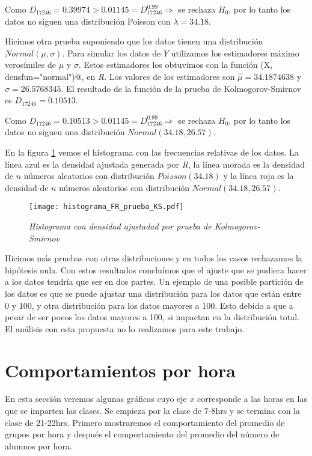 Como $D_{17246} = 0.39974 > 0.01145 = D_{17246}^{0.99} \Rightarrow $ se rechaza $H_{0}$, por lo tanto los datos no siguen una distribución Poisson con $\lambda = 34.18$.


Hicimos otra prueba suponiendo que los datos tienen una distribución $Normal(\mu,\sigma)$. Para simular los datos de $Y$ utilizamos los estimadores máximo verosímiles de $\mu$ y $\sigma$. Estos estimadores los obtuvimos con la función \verb@fitdistr(X, densfun="normal")@, en \textit{R}. Los valores de los estimadores son $\hat{\mu} = 34.1874638$ y $\hat{\sigma} = 26.5768345$. El resultado de la función de la prueba de Kolmogorov-Smirnov es $D_{17246} = 0.10513$.

Como $D_{17246} = 0.10513 > 0.01145 = D_{17246}^{0.99} \Rightarrow $ se rechaza $H_{0}$, por lo tanto los datos no siguen una distribución $Normal(34.18,26.57)$.

En la figura \ref{histFR_pruebaKS} vemos el histograma con las frecuencias relativas de los datos. La línea azul es la densidad ajustada generada por \textit{R}, la línea morada es la densidad de $n$ números aleatorios con distribución  $Poisson(34.18)$ y la línea roja es la densidad de $n$ números aleatorios con distribución  $Normal(34.18,26.57)$.

\begin{figure}[H]
\centering
\texttt{[image: histograma\_FR\_prueba\_KS.pdf]} %
\caption{\textit{Histograma con densidad ajustadad por prueba de Kolmogorov-Smirnov}}\label{histFR_pruebaKS}
\end{figure}

Hicimos más pruebas con otras distribuciones y en todos los casos rechazamos la hipótesis nula. Con estos resultados concluímos que el ajuste que se pudiera hacer a los datos tendría que ser en dos partes. Un ejemplo de una posible partición de los datos es que se puede ajustar una distribución para los datos que están entre 0 y 100, y otra distribución para los datos mayores a 100. Esto debido a que a pesar de ser pocos los datos mayores a 100, si impactan en la distribución total. El análisis con esta propuesta no lo realizamos para este trabajo.


\section{Comportamientos por hora}

En esta sección veremos algunas gráficas cuyo eje $x$ corresponde a las horas en las que se imparten las clases. Se empieza por la clase de 7-8hrs y se termina con la clase de 21-22hrs. Primero mostraremos el comportamiento del promedio de grupos por hora y después el comportamiento del promedio del número de alumnos por hora.

